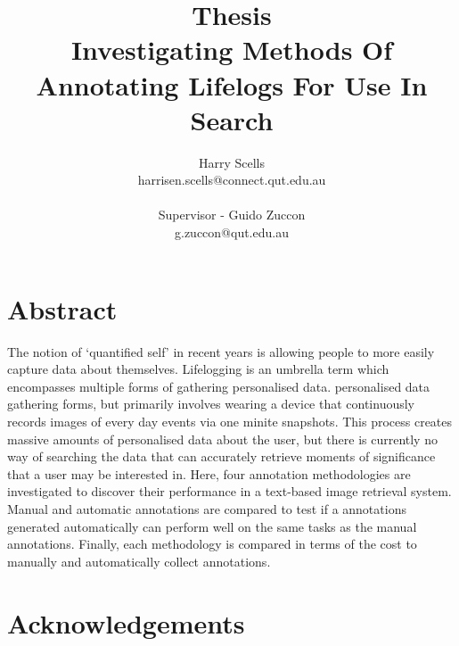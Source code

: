 \documentclass[12pt,a4paper]{book}
\begin{document}
\title{\small Thesis\\\huge Investigating Methods Of Annotating Lifelogs For Use In Search}

\author{Harry Scells\\harrisen.scells@connect.qut.edu.au\\\\\small Supervisor - Guido Zuccon\\\small g.zuccon@qut.edu.au\\}
\maketitle

\chapter*{Abstract}
The notion of `quantified self' in recent years is allowing people to more easily capture data about themselves. Lifelogging is an umbrella term which encompasses multiple forms of gathering personalised data. personalised data gathering forms, but primarily involves wearing a device that continuously records images of every day events via one minite snapshots. This process creates massive amounts of personalised data about the user, but there is currently no way of searching the data that can accurately retrieve moments of significance that a user may be interested in. Here, four annotation methodologies are investigated to discover their performance in a text-based image retrieval system. Manual and automatic annotations are compared to test if a annotations generated automatically can perform well on the same tasks as the manual annotations. Finally, each methodology is compared in terms of the cost to manually and automatically collect annotations.

\chapter*{Acknowledgements}

\tableofcontents











\end{document}
